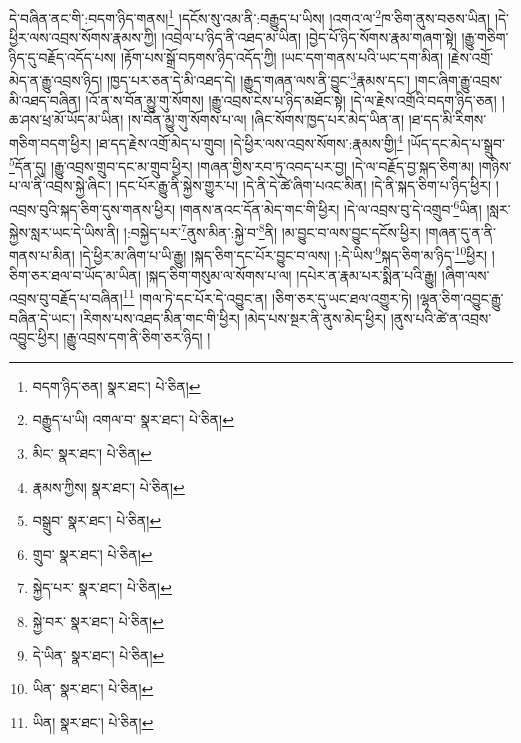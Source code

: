 དེ་བཞིན་ནང་གི་:བདག་ཉིད་གནས།\footnote{བདག་ཉིད་ཅན།  སྣར་ཐང་།  པེ་ཅིན། } །དངོས་སུ་འམ་ནི་:བརྒྱུད་པ་ཡིས། །འགའ་ལ་\footnote{བརྒྱུད་པ་ཡི། འགལ་བ་  སྣར་ཐང་།  པེ་ཅིན། }ཁ་ཅིག་ནུས་བཅས་ཡིན། །དེ་ཕྱིར་ལས་འབྲས་སོགས་རྣམས་ཀྱི། །འབྲེལ་པ་ཉིད་ནི་འཐད་མ་ཡིན། །བྱེད་པོ་ཉིད་སོགས་རྣམ་གཞག་སྟེ། །རྒྱུ་གཅིག་ཉིད་དུ་བརྗོད་འདོད་པས། །རྟོག་པས་སྒྲོ་བཏགས་ཉིད་འདོད་ཀྱི། །ཡང་དག་གནས་པའི་ཡང་དག་མིན། །རྗེས་འགྲོ་མེད་ན་རྒྱུ་འབྲས་ཉིད། །ཁྱད་པར་ཅན་དེ་མི་འཐད་དེ། །རྒྱུད་གཞན་ལས་ནི་བྱུང་\footnote{མིང་  སྣར་ཐང་།  པེ་ཅིན། }རྣམས་དང་། །གང་ཞིག་རྒྱུ་འབྲས་མི་འཐད་བཞིན། །འོ་ན་ས་བོན་མྱུ་གུ་སོགས། །རྒྱུ་འབྲས་ངེས་པ་ཉིད་མཐོང་སྟེ། །དེ་ལ་རྗེས་འགྲོའི་བདག་ཉིད་ཅན། །ཆ་ཤས་ཕྲ་མོ་ཡོད་མ་ཡིན། །ས་བོན་མྱུ་གུ་སོགས་པ་ལ། །ཞིང་སོགས་ཁྱད་པར་མེད་ཡིན་ན། །ཐ་དད་མི་རིགས་གཅིག་བདག་ཕྱིར། །ཐ་དད་རྗེས་འགྲོ་མེད་པ་གྲུབ། །དེ་ཕྱིར་ལས་འབྲས་སོགས་:རྣམས་གྱི།\footnote{རྣམས་ཀྱིས།  སྣར་ཐང་།  པེ་ཅིན། } །ཡོད་དང་མེད་པ་སྒྲུབ་\footnote{བསྒྲུབ་  སྣར་ཐང་།  པེ་ཅིན། }དོན་དུ། །རྒྱུ་འབྲས་གྲུབ་དང་མ་གྲུབ་ཕྱིར། །གཞན་གྱིས་རབ་ཏུ་འབད་པར་བྱ། །དེ་ལ་བརྗོད་བྱ་སྐད་ཅིག་མ། །གཉིས་པ་ལ་ནི་འབྲས་སྐྱེ་ཞིང་། །དང་པོར་རྒྱུ་ནི་སྐྱེས་གྱུར་པ། །དེ་ནི་དེ་ཚེ་ཞིག་པའང་མིན། །དེ་ནི་སྐད་ཅིག་པ་ཉིད་ཕྱིར། །འབྲས་བུའི་སྐད་ཅིག་དུས་གནས་ཕྱིར། །གནས་ནའང་དོན་མེད་གང་གི་ཕྱིར། །དེ་ལ་འབྲས་བུ་དེ་འགྲུབ་\footnote{གྲུབ་  སྣར་ཐང་།  པེ་ཅིན། }ཡིན། །སླར་སྐྱེས་སླར་ཡང་དེ་ཡིས་ནི། །:བསྐྱེད་པར་\footnote{སྐྱེད་པར་  སྣར་ཐང་།  པེ་ཅིན། }ནུས་མིན་:སྐྱེ་བ་\footnote{སྐྱེ་བར་  སྣར་ཐང་།  པེ་ཅིན། }ནི། །མ་བྱུང་བ་ལས་བྱུང་དངོས་ཕྱིར། །གཞན་དུ་ན་ནི་གནས་པ་མིན། །དེ་ཕྱིར་མ་ཞིག་པ་ཡི་རྒྱུ། །སྐད་ཅིག་དང་པོར་བྱུང་བ་ལས། །:དེ་ཡིས་\footnote{དེ་ཡིན་  སྣར་ཐང་།  པེ་ཅིན། }སྐད་ཅིག་མ་ཉིད་\footnote{ཡིན་  སྣར་ཐང་།  པེ་ཅིན། }ཕྱིར། །ཅིག་ཅར་ཐལ་བ་ཡོད་མ་ཡིན། །སྐད་ཅིག་གསུམ་ལ་སོགས་པ་ལ། །དཔེར་ན་རྣམ་པར་སྨིན་པའི་རྒྱུ། །ཞིག་ལས་འབྲས་བུ་བརྗོད་པ་བཞིན།\footnote{ཡིན།  སྣར་ཐང་།  པེ་ཅིན། } །གལ་ཏེ་དང་པོར་དེ་འབྱུང་ན། །ཅིག་ཅར་དུ་ཡང་ཐལ་འགྱུར་ཏེ། །ལྷན་ཅིག་འབྱུང་རྒྱུ་བཞིན་དེ་ཡང་། །རིགས་པས་འཐད་མིན་གང་གི་ཕྱིར། །མེད་པས་སྔར་ནི་ནུས་མེད་ཕྱིར། །ནུས་པའི་ཚེ་ན་འབྲས་འབྱུང་ཕྱིར། །རྒྱུ་འབྲས་དག་ནི་ཅིག་ཅར་ཉིད། །
